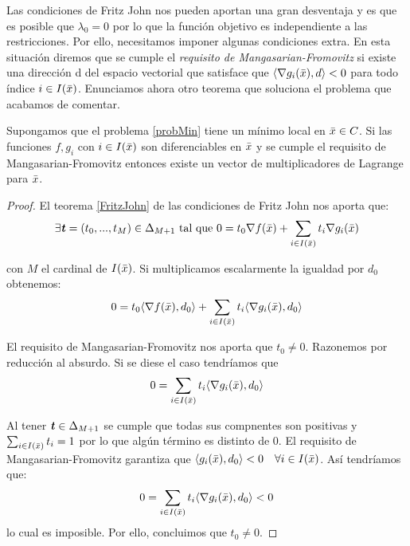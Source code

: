 		Las condiciones de Fritz John nos pueden aportan una gran desventaja y es que es posible que $ \lambda_0 = 0 $ por lo que la función objetivo es independiente a las restricciones. Por ello, necesitamos imponer algunas condiciones extra. En esta situación diremos que se cumple el \textit{requisito de Mangasarian-Fromovitz} si existe una dirección d del espacio vectorial que satisface que $ \langle \nabla g_i(\bar{x}),d \rangle < 0 $ para todo índice $ i \in I(\bar{x})$. Enunciamos ahora otro teorema que soluciona el problema que acabamos de comentar.
		
		\begin{teoremaBox}
		Supongamos que el problema \ref{probMin} tiene un mínimo local en $ \bar{x} \in C $. Si las funciones $ f, g_i $ con $ i \in I(\bar{x}) $ son diferenciables en $ \bar{x} $ y se cumple el requisito de Mangasarian-Fromovitz entonces existe un vector de multiplicadores de Lagrange para $ \bar{x} $.
		\end{teoremaBox} 
	
		\begin{proof}
		El teorema \ref{FritzJohn} de las condiciones de Fritz John nos aporta que:
		\[
		\exists \textbf{\emph{t}} = (t_0, ..., t_{M})\in \Delta_{M+1}  \text{ tal que }0 = t_0 \nabla f(\bar{x}) + \sum_{i \in I(\bar{x})}  t_i \nabla g_i (\bar{x})
		\]
		
		con $ M $ el cardinal de $ I(\bar{x}) $. Si multiplicamos escalarmente la igualdad por $ d_0 $ obtenemos:
		\[
		0 = t_0 \langle \nabla f(\bar{x}), d_0 \rangle + \sum_{i \in I(\bar{x})}  t_i \langle \nabla g_i (\bar{x}), d_0 \rangle
		\]
		
		El requisito de Mangasarian-Fromovitz nos aporta que $ t_0 \neq 0$. Razonemos por reducción al absurdo. Si se diese el caso tendríamos que
		\[
		0 = \sum_{i \in I(\bar{x})}  t_i \langle \nabla g_i (\bar{x}), d_0 \rangle
		\]
		
		Al tener $ \textbf{\emph{t}} \in \Delta_{M+1} $ se cumple que todas sus compnentes son positivas y $ \sum_{i \in I(\bar{x})}  t_i = 1 $ por lo que algún término es distinto de 0. El requisito de Mangasarian-Fromovitz garantiza que $  \langle g_i (\bar{x}), d_0 \rangle < 0 \quad \forall i \in I(\bar{x}) $. Así tendríamos que:
			\[
		0 = \sum_{i \in I(\bar{x})}  t_i \langle \nabla g_i (\bar{x}), d_0 \rangle < 0
		\]
		lo cual es imposible. Por ello, concluimos que $ t_0 \neq 0 $.
		\end{proof}
		